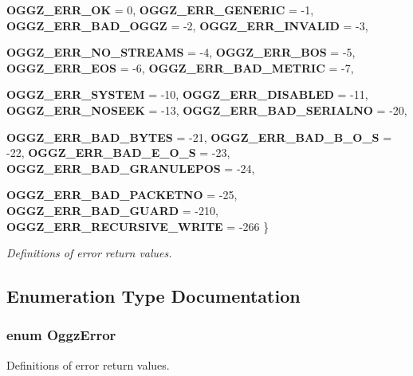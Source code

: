 \begin{CompactItemize}
{\bf OGGZ\_\-ERR\_\-OK} =  0, 
{\bf OGGZ\_\-ERR\_\-GENERIC} =  -1, 
{\bf OGGZ\_\-ERR\_\-BAD\_\-OGGZ} =  -2, 
{\bf OGGZ\_\-ERR\_\-INVALID} =  -3, 
\par
{\bf OGGZ\_\-ERR\_\-NO\_\-STREAMS} =  -4, 
{\bf OGGZ\_\-ERR\_\-BOS} =  -5, 
{\bf OGGZ\_\-ERR\_\-EOS} =  -6, 
{\bf OGGZ\_\-ERR\_\-BAD\_\-METRIC} =  -7, 
\par
{\bf OGGZ\_\-ERR\_\-SYSTEM} =  -10, 
{\bf OGGZ\_\-ERR\_\-DISABLED} =  -11, 
{\bf OGGZ\_\-ERR\_\-NOSEEK} =  -13, 
{\bf OGGZ\_\-ERR\_\-BAD\_\-SERIALNO} =  -20, 
\par
{\bf OGGZ\_\-ERR\_\-BAD\_\-BYTES} =  -21, 
{\bf OGGZ\_\-ERR\_\-BAD\_\-B\_\-O\_\-S} =  -22, 
{\bf OGGZ\_\-ERR\_\-BAD\_\-E\_\-O\_\-S} =  -23, 
{\bf OGGZ\_\-ERR\_\-BAD\_\-GRANULEPOS} =  -24, 
\par
{\bf OGGZ\_\-ERR\_\-BAD\_\-PACKETNO} =  -25, 
{\bf OGGZ\_\-ERR\_\-BAD\_\-GUARD} =  -210, 
{\bf OGGZ\_\-ERR\_\-RECURSIVE\_\-WRITE} =  -266
 \}
\begin{CompactList}\small\item\em Definitions of error return values. \item\end{CompactList}\end{CompactItemize}


\subsection{Enumeration Type Documentation}
\subsubsection{\setlength{\rightskip}{0pt plus 5cm}enum {\bf Oggz\-Error}}\label{oggz__constants_8h_a38}


Definitions of error return values. 

